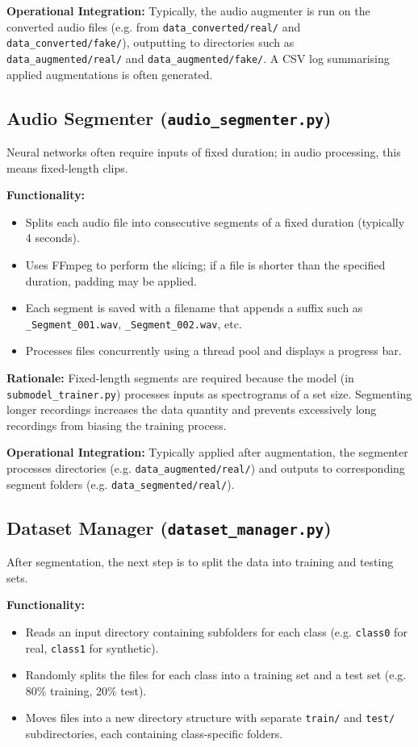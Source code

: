 \documentclass[conference]{IEEEtran}  %
\begin{document}
\textbf{Operational Integration:} Typically, the audio augmenter is run on the converted audio files (e.g. from \texttt{data\_converted/real/} and \texttt{data\_converted/fake/}), outputting to directories such as \texttt{data\_augmented/real/} and \texttt{data\_augmented/fake/}. A CSV log summarising applied augmentations is often generated.

\subsection{Audio Segmenter (\texttt{audio\_segmenter.py})}
Neural networks often require inputs of fixed duration; in audio processing, this means fixed-length clips.

\textbf{Functionality:}
\begin{itemize}
    \item Splits each audio file into consecutive segments of a fixed duration (typically 4 seconds).
    \item Uses FFmpeg to perform the slicing; if a file is shorter than the specified duration, padding may be applied.
    \item Each segment is saved with a filename that appends a suffix such as \texttt{\_Segment\_001.wav}, \texttt{\_Segment\_002.wav}, etc.
    \item Processes files concurrently using a thread pool and displays a progress bar.
\end{itemize}

\textbf{Rationale:} Fixed-length segments are required because the model (in \texttt{submodel\_trainer.py}) processes inputs as spectrograms of a set size. Segmenting longer recordings increases the data quantity and prevents excessively long recordings from biasing the training process.

\textbf{Operational Integration:} Typically applied after augmentation, the segmenter processes directories (e.g. \texttt{data\_augmented/real/}) and outputs to corresponding segment folders (e.g. \texttt{data\_segmented/real/}).

\subsection{Dataset Manager (\texttt{dataset\_manager.py})}
After segmentation, the next step is to split the data into training and testing sets.

\textbf{Functionality:}
\begin{itemize}
    \item Reads an input directory containing subfolders for each class (e.g. \texttt{class0} for real, \texttt{class1} for synthetic).
    \item Randomly splits the files for each class into a training set and a test set (e.g. 80\% training, 20\% test).
    \item Moves files into a new directory structure with separate \texttt{train/} and \texttt{test/} subdirectories, each containing class-specific folders.
\end{itemize}
\end{document}
